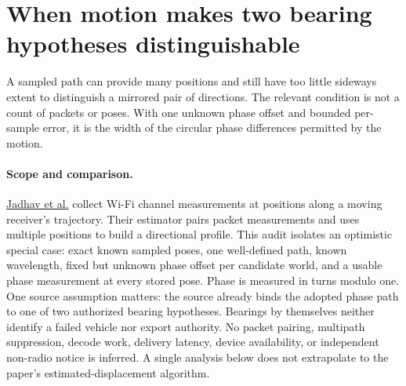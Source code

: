 \documentclass[11pt]{article}
\begin{document}
\section*{When motion makes two bearing hypotheses distinguishable}
A sampled path can provide many positions and still have too little sideways extent to distinguish a mirrored pair of directions. The relevant condition is not a count of packets or poses. With one unknown phase offset and bounded per-sample error, it is the width of the circular phase differences permitted by the motion.

\paragraph{Scope and comparison.}
\href{https://arxiv.org/pdf/2109.12205}{Jadhav et al.} collect Wi-Fi channel measurements at positions along a moving receiver's trajectory. Their estimator pairs packet measurements and uses multiple positions to build a directional profile. This audit isolates an optimistic special case: exact known sampled poses, one well-defined path, known wavelength, fixed but unknown phase offset per candidate world, and a usable phase measurement at every stored pose. Phase is measured in turns modulo one. One source assumption matters: the source already binds the adopted phase path to one of two authorized bearing hypotheses. Bearings by themselves neither identify a failed vehicle nor export authority. No packet pairing, multipath suppression, decode work, delivery latency, device availability, or independent non-radio notice is inferred. A single analysis below does not extrapolate to the paper's estimated-displacement algorithm.
\end{document}
